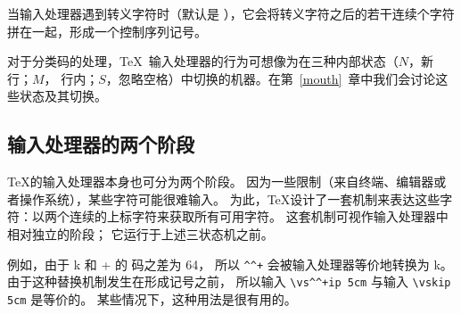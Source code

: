 \documentclass{book}
\begin{document}
当输入处理器遇到转义字符时（默认是 \cs{}），它会将转义字符之后的若干连续个字符拼在一起，形成一个控制序列记号。

对于分类码的处理，\TeX\ 输入处理器的行为可想像为在三种内部状态（$N$，新行；$M$，
行内；$S$，忽略空格）中切换的机器。在第~\ref{mouth}~章中我们会讨论这些状态及其切换。

\subsection{输入处理器的两个阶段}

\TeX 的输入处理器本身也可分为两个阶段。
因为一些限制（来自终端、编辑器或者操作系统），某些字符可能很难输入。
为此，\TeX 设计了一套机制来表达这些字符：以两个连续的上标字符来获取所有可用字符。
这套机制可视作输入处理器中相对独立的阶段；
它运行于上述三状态机之前。

例如，由于 \n k 和 \n + 的 \ascii{} 码之差为 64，
所以 \verb>^^+> 会被输入处理器等价地转换为 \n k。
由于这种替换机制发生在形成记号之前，
所以输入 \verb>\vs^^+ip 5cm> 与输入 \verb>\vskip 5cm> 是等价的。
某些情况下，这种用法是很有用的。
\end{document}

